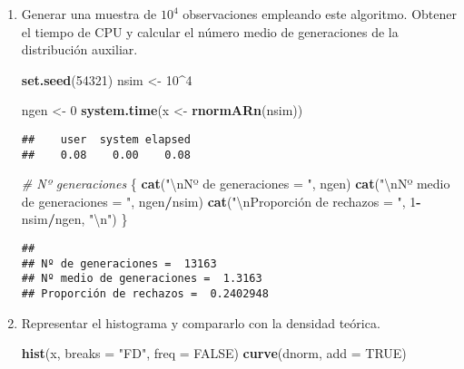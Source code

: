 \documentclass[
]{book}
\newenvironment{Shaded}{\begin{snugshade}}{\end{snugshade}}
\newcommand{\CharTok}[1]{\textcolor[rgb]{0.31,0.60,0.02}{#1}}
\newcommand{\CommentTok}[1]{\textcolor[rgb]{0.56,0.35,0.01}{\textit{#1}}}
\newcommand{\DataTypeTok}[1]{\textcolor[rgb]{0.13,0.29,0.53}{#1}}
\newcommand{\DecValTok}[1]{\textcolor[rgb]{0.00,0.00,0.81}{#1}}
\newcommand{\KeywordTok}[1]{\textcolor[rgb]{0.13,0.29,0.53}{\textbf{#1}}}
\newcommand{\NormalTok}[1]{#1}
\newcommand{\OperatorTok}[1]{\textcolor[rgb]{0.81,0.36,0.00}{\textbf{#1}}}
\newcommand{\OtherTok}[1]{\textcolor[rgb]{0.56,0.35,0.01}{#1}}
\newcommand{\StringTok}[1]{\textcolor[rgb]{0.31,0.60,0.02}{#1}}
\theoremstyle{break}
\theoremstyle{definition}
\theoremstyle{definition}
\theoremstyle{definition}
\theoremstyle{remark}
\begin{document}
\begin{enumerate}
\def\labelenumi{\alph{enumi})}
\item
  Generar una muestra de \(10^{4}\) observaciones empleando este
  algoritmo. Obtener el tiempo de CPU y calcular el número medio
  de generaciones de la distribución auxiliar.

\begin{Shaded}
\begin{Highlighting}[]
\KeywordTok{set.seed}\NormalTok{(}\DecValTok{54321}\NormalTok{)}
\NormalTok{nsim <-}\StringTok{ }\DecValTok{10}\OperatorTok{^}\DecValTok{4}

\NormalTok{ngen <-}\StringTok{ }\DecValTok{0}
\KeywordTok{system.time}\NormalTok{(x <-}\StringTok{ }\KeywordTok{rnormARn}\NormalTok{(nsim))}
\end{Highlighting}
\end{Shaded}

\begin{verbatim}
##    user  system elapsed 
##    0.08    0.00    0.08
\end{verbatim}

\begin{Shaded}
\begin{Highlighting}[]
\CommentTok{# Nº generaciones}
\NormalTok{\{}
\KeywordTok{cat}\NormalTok{(}\StringTok{"}\CharTok{\textbackslash{}n}\StringTok{Nº de generaciones = "}\NormalTok{, ngen)}
\KeywordTok{cat}\NormalTok{(}\StringTok{"}\CharTok{\textbackslash{}n}\StringTok{Nº medio de generaciones = "}\NormalTok{, ngen}\OperatorTok{/}\NormalTok{nsim)}
\KeywordTok{cat}\NormalTok{(}\StringTok{"}\CharTok{\textbackslash{}n}\StringTok{Proporción de rechazos = "}\NormalTok{, }\DecValTok{1}\OperatorTok{-}\NormalTok{nsim}\OperatorTok{/}\NormalTok{ngen, }\StringTok{"}\CharTok{\textbackslash{}n}\StringTok{"}\NormalTok{)}
\NormalTok{\}}
\end{Highlighting}
\end{Shaded}

\begin{verbatim}
## 
## Nº de generaciones =  13163
## Nº medio de generaciones =  1.3163
## Proporción de rechazos =  0.2402948
\end{verbatim}
\item
  Representar el histograma y compararlo con la densidad teórica.

\begin{Shaded}
\begin{Highlighting}[]
\KeywordTok{hist}\NormalTok{(x, }\DataTypeTok{breaks =} \StringTok{"FD"}\NormalTok{, }\DataTypeTok{freq =} \OtherTok{FALSE}\NormalTok{)}
\KeywordTok{curve}\NormalTok{(dnorm, }\DataTypeTok{add =} \OtherTok{TRUE}\NormalTok{)}
\end{Highlighting}
\end{Shaded}


\end{enumerate}
\end{document}
